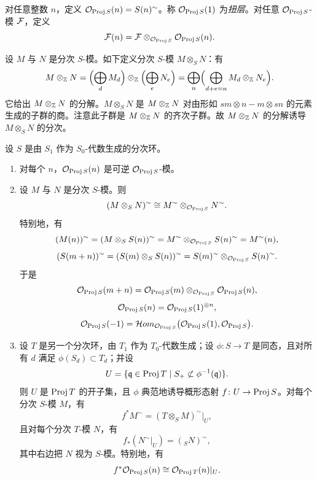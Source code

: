 对任意整数 $n$，定义 $\mathcal{O}_{\operatorname{Proj} S}(n)=S(n)^\sim$。称 $\mathcal{O}_{\operatorname{Proj} S}(1)$ 为\emph{扭层}。对任意 $\mathcal{O}_{\operatorname{Proj} S}$-模 $\mathcal{F}$，定义
\[
\mathcal{F}(n)=\mathcal{F}\otimes_{\mathcal{O}_{\operatorname{Proj} S}}\mathcal{O}_{\operatorname{Proj} S}(n).
\]

设 $M$ 与 $N$ 是分次 $S$-模。如下定义分次 $S$-模 $M\otimes_SN$：有
\[
M\otimes_{\mathbb{Z}}N=\Bigl(\bigoplus_dM_d\Bigr)\otimes_{\mathbb{Z}}\Bigl(\bigoplus_eN_e\Bigr)=\bigoplus_n\Bigl(\bigoplus_{d+e=n}M_d\otimes_{\mathbb{Z}}N_e\Bigr).
\]
它给出 $M\otimes_{\mathbb{Z}}N$ 的分解。$M\otimes_SN$ 是 $M\otimes_{\mathbb{Z}}N$ 对由形如 $sm\otimes n-m\otimes sn$ 的元素生成的子群的商。注意此子群是 $M\otimes_{\mathbb{Z}}N$ 的齐次子群。故 $M\otimes_{\mathbb{Z}}N$ 的分解诱导 $M\otimes_SN$ 的分次。

\begin{proposition}\label{it:1.4.20}
设 $S$ 是由 $S_1$ 作为 $S_0$-代数生成的分次环。
\begin{enumerate}[label=(\roman*),leftmargin=2.8em]
  \item 对每个 $n$，$\mathcal{O}_{\operatorname{Proj} S}(n)$ 是可逆 $\mathcal{O}_{\operatorname{Proj} S}$-模。
  \item 设 $M$ 与 $N$ 是分次 $S$-模。则
  \[
  (M\otimes_SN)^\sim\cong M^\sim\otimes_{\mathcal{O}_{\operatorname{Proj} S}}N^\sim.
  \]
  特别地，有
  \[
  (M(n))^\sim=(M\otimes_SS(n))^\sim=M^\sim\otimes_{\mathcal{O}_{\operatorname{Proj} S}}S(n)^\sim=M^\sim(n),
  \]
  \[
  (S(m+n))^\sim=(S(m)\otimes_SS(n))^\sim=S(m)^\sim\otimes_{\mathcal{O}_{\operatorname{Proj} S}}S(n)^\sim.
  \]
  于是
  \[
  \mathcal{O}_{\operatorname{Proj} S}(m+n)=\mathcal{O}_{\operatorname{Proj} S}(m)\otimes_{\mathcal{O}_{\operatorname{Proj} S}}\mathcal{O}_{\operatorname{Proj} S}(n),
  \]
  \[
  \mathcal{O}_{\operatorname{Proj} S}(n)=\mathcal{O}_{\operatorname{Proj} S}(1)^{\otimes n},
  \]
  \[
  \mathcal{O}_{\operatorname{Proj} S}(-1)=\mathcal{H}om_{\mathcal{O}_{\operatorname{Proj} S}}\bigl(\mathcal{O}_{\operatorname{Proj} S}(1),\mathcal{O}_{\operatorname{Proj} S}\bigr).
  \]
  \item 设 $T$ 是另一个分次环，由 $T_1$ 作为 $T_0$-代数生成；设 $\phi\colon S\to T$ 是同态，且对所有 $d$ 满足 $\phi(S_d)\subset T_d$；并设
  \[
  U=\{\mathfrak{q}\in\operatorname{Proj} T\mid S_+\not\subset\phi^{-1}(\mathfrak{q})\}.
  \]
  则 $U$ 是 $\operatorname{Proj} T$ 的开子集，且 $\phi$ 典范地诱导概形态射 $f\colon U\to\operatorname{Proj} S$。对每个分次 $S$-模 $M$，有
  \[
  f^*M^\sim=(T\otimes_SM)^\sim|_U,
  \]
  且对每个分次 $T$-模 $N$，有
  \[
  f_*(N^\sim|_U)=({}_SN)^\sim,
  \]
  其中右边把 $N$ 视为 $S$-模。特别地，有
  \[
  f^*\mathcal{O}_{\operatorname{Proj} S}(n)\cong\mathcal{O}_{\operatorname{Proj} T}(n)|_U.
  \]
\end{enumerate}
\end{proposition}

